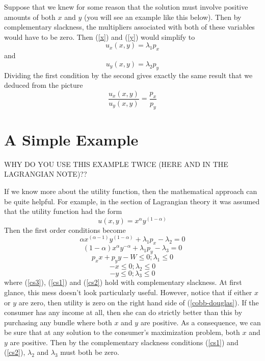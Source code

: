 \documentclass[12pt]{article}
\begin{document}
Suppose that we knew for some reason that the solution must involve positive
amounts of both $x$ and $y$ (you will see an example like this below). Then by
complementary slackness, the multipliers associated with both of these
variables would have to be zero. Then (\ref{x}) and (\ref{y}) would simplify
to
\[ u_x ( x, y ) = \lambda_1 p_x \]
and
\[ u_y ( x, y ) = \lambda_2 p_y \]
Dividing the first condition by the second gives exactly the same result that
we deduced from the picture
\[ \frac{u_x ( x, y )}{u_y ( x, y )} = \frac{p_x}{p_y} \]

\section{A Simple Example}

WHY DO YOU USE THIS EXAMPLE TWICE (HERE AND IN THE LAGRANGIAN NOTE)??

If we know more about the utility function, then the mathematical approach can
be quite helpful. For example, in the section of Lagrangian theory it was
assumed that the utility function had the form
\begin{equation}
  u ( x, y ) = x^{\alpha} y^{( 1 - \alpha )} \label{cobb-douglas}
\end{equation}
Then the first order conditions become
\begin{equation}
  \alpha x^{( \alpha - 1 )} y^{( 1 - \alpha )} + \lambda_1 p_x - \lambda_2 = 0
\end{equation}
\begin{equation}
  ( 1 - \alpha ) x^{\alpha} y^{- \alpha} + \lambda_1 p_y - \lambda_3 = 0
\end{equation}
\begin{equation}
  p_x x + p_y y - W \leqslant 0 ; \lambda_1 \leqslant 0 \label{cs3}
\end{equation}
\begin{equation}
  - x \leqslant 0 ; \lambda_2 \leqslant 0 \label{cs1}
\end{equation}
\begin{equation}
  - y \leqslant 0 ; \lambda_3 \leqslant 0 \label{cs2}
\end{equation}
where (\ref{cs3}), (\ref{cs1}) and (\ref{cs2}) hold with complementary
slackness. At first glance, this mess doesn't look particularly useful.
However, notice that if either $x$ or $y$ are zero, then utility is zero on
the right hand side of (\ref{cobb-douglas}). If the consumer has any income at
all, then she can do strictly better than this by purchasing any bundle where
both $x$ and $y$ are positive. As a consequence, we can be sure that at any
solution to the consumer's maximization problem, both $x$ and $y$ are
positive. Then by the complementary slackness conditions (\ref{cs1}) and
(\ref{cs2}), $\lambda_2$ and $\lambda_3$ must both be zero.
\end{document}
